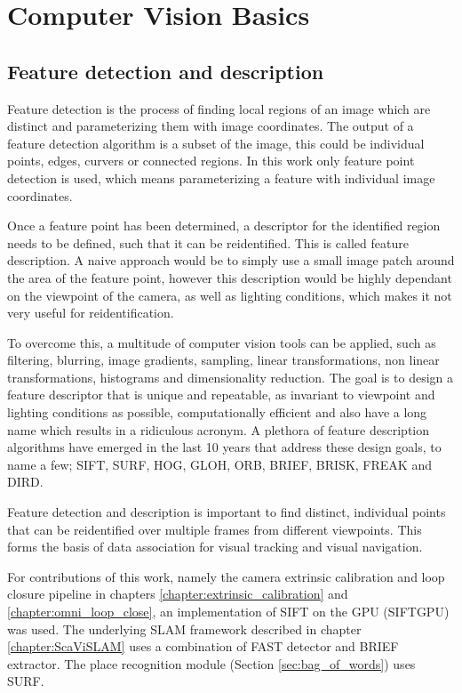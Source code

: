 \section{Computer Vision Basics}
\label{sec:computer_vision}

\subsection{Feature detection and description}
\label{subsec:features}

Feature detection is the process of finding local regions of an image which are distinct and parameterizing them with image coordinates.  The output of a feature detection algorithm is a subset of the image, this could be individual points, edges, curvers or connected regions.  In this work only feature point detection is used, which means parameterizing a feature with individual image coordinates.

Once a feature point has been determined, a descriptor for the identified region needs to be defined, such that it can be reidentified.  This is called feature description.  A naive approach would be to simply use a small image patch around the area of the feature point, however this description would be highly dependant on the viewpoint of the camera, as well as lighting conditions, which makes it not very useful for reidentification.

To overcome this, a multitude of computer vision tools can be applied, such as filtering, blurring, image gradients, sampling, linear transformations, non linear transformations, histograms and dimensionality reduction.  The goal is to design a feature descriptor that is unique and repeatable, as invariant to viewpoint and lighting conditions as possible, computationally efficient and also have a long name which results in a ridiculous acronym.  A plethora of feature description algorithms have emerged in the last 10 years that address these design goals, to name a few; SIFT, SURF, HOG, GLOH, ORB, BRIEF, BRISK, FREAK and DIRD.

Feature detection and description is important to find distinct, individual points that can be reidentified over multiple frames from different viewpoints.  This forms the basis of data association for visual tracking and visual navigation.

For contributions of this work, namely the camera extrinsic calibration and loop closure pipeline in chapters \ref{chapter:extrinsic_calibration} and \ref{chapter:omni_loop_close}, an implementation of SIFT on the GPU (SIFTGPU) was used.  The underlying SLAM framework described in chapter \ref{chapter:ScaViSLAM} uses a combination of FAST detector and BRIEF extractor.  The place recognition module (Section \ref{sec:bag_of_words}) uses SURF.

